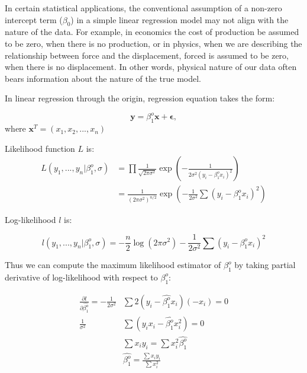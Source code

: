 \documentclass[12pt,a4paper,oneside]{book} %
\begin{document}
	In certain statistical applications, the conventional assumption of a non-zero intercept term ($\beta_0$) in a simple linear regression model may not align with the nature of the data. For example, in economics the cost of production be assumed to be zero, when there is no production, or in physics, when we are describing the relationship between force and the displacement, forced is assumed to be zero, when there is no displacement. In other words, physical nature of our data often bears information about the nature of the true model. 
	
	
	In linear regression through the origin, regression equation takes the form:
	
	\begin{equation}
		\mathbf{y} = \beta_1^o \mathbf{x} + \mathbf{\epsilon},
	\end{equation}
	where $\mathbf{x}^T=(x_1,x_2,...,x_n)$
	
	
	
	Likelihood function $L$ is:
	\begin{align*}
		L(y_1,...,y_n | \beta_1^o, \sigma) &= \prod \frac{1}{\sqrt{2 \pi \sigma^2}} \exp(-\frac{1}{2\sigma^2 (y_i-\beta_1^o x_i)^2}) \\
		&= \frac{1}{(2\pi \sigma^2)^{n/2}}\exp(-\frac{1}{2\sigma^2} \sum (y_i-\beta_1^o x_i)^2)
	\end{align*}

	Log-likelihood $l$ is:

\[
	l(y_1,...,y_n | \beta_1^o, \sigma)=-\frac{n}{2}\log(2\pi \sigma^2)-\frac{1}{2 \sigma^2} \sum (y_i - \beta_1^o x_i)^2
\]

Thus we can compute the maximum likelihood estimator of $\beta_1^o$ by taking partial derivative of log-likelihood with respect to $\beta_1^o$:

\begin{align*}
	\frac{\partial l}{\partial \hat{\beta_1^o}} = - \frac{1}{2 \sigma^2} & \sum 2(y_i-\hat{\beta_1^o} x_i)(-x_i)=0 \\
	\frac{1}{\sigma^2}& \sum (y_i x_i - \hat{\beta_1^o} x_i ^2) = 0 \\
	& \sum x_i y_i =  \sum  x_i^2 \hat{\beta_1^o} \\
	& \hat{\beta_1^o} = \frac{\sum x_i y_i}{\sum x_i^2}
\end{align*}
\end{document}
